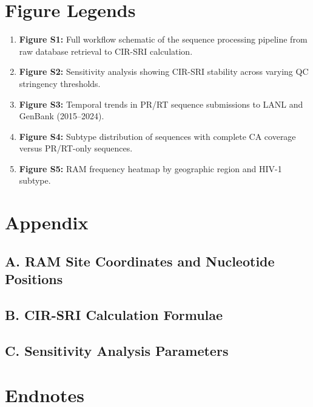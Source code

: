 \documentclass[12pt]{article}
\begin{document}
\section*{Figure Legends}\label{sec:figure_legends}

\begin{enumerate}
    \item \textbf{Figure S1:} Full workflow schematic of the sequence processing
    pipeline from raw database retrieval to CIR-SRI calculation.

    \item \textbf{Figure S2:} Sensitivity analysis showing CIR-SRI stability
    across varying QC stringency thresholds.

    \item \textbf{Figure S3:} Temporal trends in PR/RT sequence submissions
    to LANL and GenBank (2015--2024).

    \item \textbf{Figure S4:} Subtype distribution of sequences with complete
    CA coverage versus PR/RT-only sequences.

    \item \textbf{Figure S5:} RAM frequency heatmap by geographic region and
    HIV-1 subtype.
\end{enumerate}

\clearpage
\appendix
\section*{Appendix}\label{sec:appendix}

\subsection*{A. RAM Site Coordinates and Nucleotide Positions}


\subsection*{B. CIR-SRI Calculation Formulae}


\subsection*{C. Sensitivity Analysis Parameters}


\clearpage
\section*{Endnotes}\label{sec:endnotes}
\theendnotes

\end{document}
